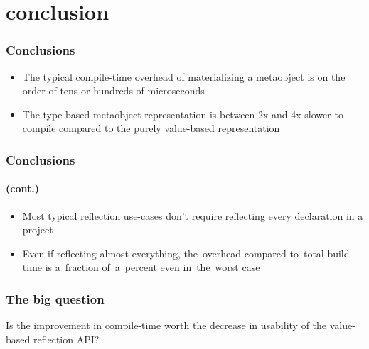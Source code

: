 \documentclass[compress,table,xcolor=table]{beamer}
\begin{document}
\section{conclusion}
\begin{frame}
  \frametitle{Conclusions}
  \Large
  \begin{itemize}
    \item The typical compile-time overhead of materializing a metaobject
      is on the order of tens or hundreds of microseconds
    \item The type-based metaobject representation is between 2x and 4x
      slower to compile compared to the purely value-based representation
  \end{itemize}
\end{frame}
\begin{frame}
  \frametitle{Conclusions}
  \framesubtitle{(cont.)}
  \Large
  \begin{itemize}
    \item Most typical reflection use-cases don't require reflecting every
      declaration in a project
    \item Even if reflecting almost everything, the~overhead compared
      to~total build time is a~fraction of~a~percent even in~the~worst case
  \end{itemize}
\end{frame}
\begin{frame}
  \frametitle{The {\larger big} question}
  \Large
  \centering
  Is the improvement in compile-time worth the decrease in usability
  of the value-based reflection API?
\end{frame}
\end{document}

